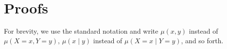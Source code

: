 \section{Proofs} \label{sec:proofs}
		For brevity, we use the standard notation and write $\mu(x, y)$
	instead of $\mu(X \!=\! x, Y \!=\! y)$, $\mu(x \mid y)$ instead of
	$\mu(X \!=\! x\mid Y \!=\! y)$, and so forth.

